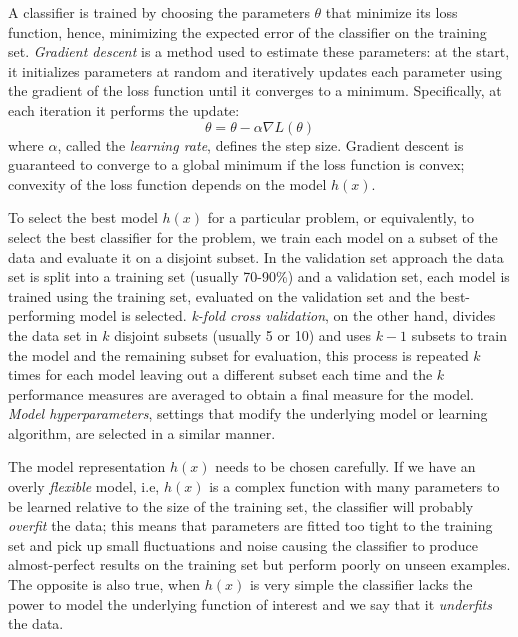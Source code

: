 A classifier is trained by choosing the parameters $\theta$ that minimize its loss function, hence, minimizing the expected error of the classifier on the training set. \emph{Gradient descent} is a method used to estimate these parameters: at the start, it initializes parameters at random and iteratively updates each parameter using the gradient of the loss function until it converges to a minimum. Specifically, at each iteration it performs the update:
\begin{equation}
	\theta = \theta - \alpha \nabla{L(\theta)}
\end{equation}
where $\alpha$, called the \emph{learning rate}, defines the step size. Gradient descent is guaranteed to converge to a global minimum if the loss function is convex; convexity of the loss function depends on the model $h(x)$.

To select the best model $h(x)$ for a particular problem, or equivalently, to select the best classifier for the problem, we train each model on a subset of the data and evaluate it on a disjoint subset. In the {validation set approach} the data set is split into a training set (usually 70-90\%) and a validation set, each model is trained using the training set, evaluated on the validation set and the best-performing model is selected. \emph{k-fold cross validation}, on the other hand, divides the data set in $k$ disjoint subsets (usually 5 or 10) and uses $k-1$ subsets to train the model and the remaining subset for evaluation, this process is repeated $k$ times for each model leaving out a different subset each time and the $k$ performance measures are averaged to obtain a final measure for the model.
\emph{Model hyperparameters}, settings that modify the underlying model or learning algorithm, are selected in a similar manner.

The model representation $h(x)$ needs to be chosen carefully. If we have an overly \emph{flexible} model, i.e, $h(x)$ is a complex function with many parameters to be learned relative to the size of the training set, the classifier will probably \emph{overfit} the data; this means that parameters are fitted too tight to the training set and pick up small fluctuations and noise causing the classifier to produce almost-perfect results on the training set but perform poorly on unseen examples. The opposite is also true, when $h(x)$ is very simple the classifier lacks the power to model the underlying function of interest and we say that it \emph{underfits} the data.%

